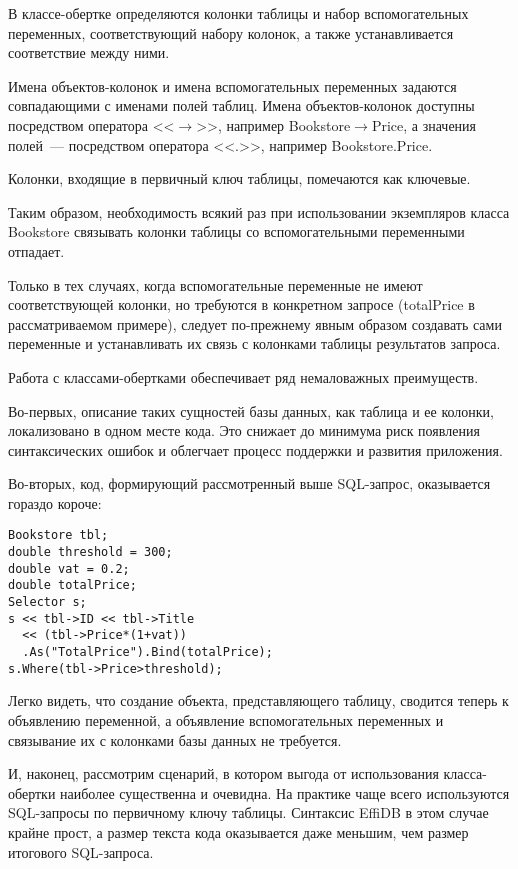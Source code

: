 \begin{multicols}{2}

В классе-обертке определяются колонки таблицы и набор вспомогательных переменных, 
соответствующий набору колонок, а также устанавливается соответствие между ними. 

Имена объек\-тов-ко\-ло\-нок и имена вспомогательных переменных задаются 
совпадающими с именами полей таблиц. Имена объектов-колонок доступны посредством 
оператора <<$\rightarrow$>>, например Bookstore$\rightarrow$Price, а значения полей~--- 
посредством оператора <<.>>, например \mbox{Bookstore.Price}. 

Колонки, входящие в первичный 
ключ таблицы, помечаются как ключевые.

Таким образом, необходимость всякий раз при использовании экземпляров класса 
Bookstore связывать колонки таблицы со вспомогательными переменными отпадает. 

Только в тех случаях, когда вспомогательные переменные не имеют соответствующей 
колонки, но требуются в конкретном запросе (totalPrice в рассматриваемом примере), 
следует по-прежнему явным образом создавать сами переменные и устанавливать их связь 
с колонками таблицы результатов запроса.

Работа с классами-обертками обеспечивает ряд немаловажных преимуществ.

Во-первых, описание таких сущностей базы данных, как таблица и ее колонки, 
локализовано в одном месте кода. Это снижает до минимума риск появления 
синтаксических ошибок и облегчает процесс поддержки и развития приложения.

Во-вторых, код, формирующий рассмотренный выше SQL-за\-прос, оказывается гораздо 
короче: 
\begin{verbatim}
Bookstore tbl;
double threshold = 300;
double vat = 0.2;
double totalPrice;
Selector s;
s << tbl->ID << tbl->Title
  << (tbl->Price*(1+vat))
  .As("TotalPrice").Bind(totalPrice);
s.Where(tbl->Price>threshold);
\end{verbatim}

Легко видеть, что создание объекта, пред\-став\-ля\-юще\-го таблицу, сводится теперь к 
объявлению переменной, а объявление вспомогательных переменных и связывание их с 
колонками базы данных не требуется.

И, наконец, рассмотрим сценарий, в котором выгода от использования клас\-са-оберт\-ки 
наиболее существенна и очевидна. На практике чаще всего используются SQL-за\-про\-сы 
по первичному ключу таблицы. Синтаксис EffiDB в этом случае крайне прост, а размер 
текста кода оказывается даже меньшим, чем размер итогового SQL-за\-проса.


\end{multicols}
